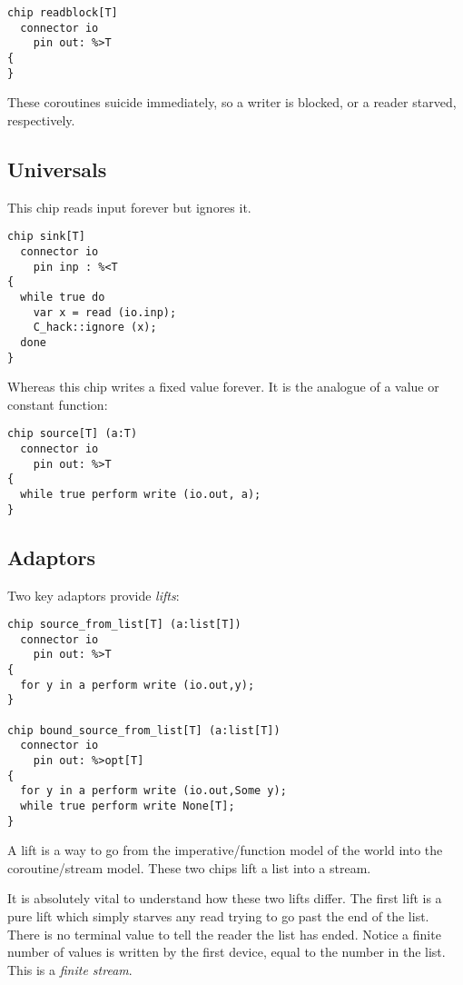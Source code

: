 \documentclass[oneside]{book}
\begin{document}
\begin{verbatim}
chip readblock[T]
  connector io
    pin out: %>T
{
}
\end{verbatim}

These coroutines suicide immediately, so a writer is blocked,
or a reader starved, respectively.

\subsection{Universals}
This chip reads input forever but ignores it.

\begin{verbatim}
chip sink[T]
  connector io
    pin inp : %<T
{
  while true do
    var x = read (io.inp);
    C_hack::ignore (x);
  done
}
\end{verbatim}

Whereas this chip writes a fixed value forever.
It is the analogue of a value or constant function:

\begin{verbatim}
chip source[T] (a:T)
  connector io
    pin out: %>T
{
  while true perform write (io.out, a);
}
\end{verbatim}

\subsection{Adaptors}
Two key adaptors provide {\em lifts}:


\begin{verbatim}
chip source_from_list[T] (a:list[T])
  connector io
    pin out: %>T
{
  for y in a perform write (io.out,y);
}

chip bound_source_from_list[T] (a:list[T])
  connector io
    pin out: %>opt[T]
{
  for y in a perform write (io.out,Some y);
  while true perform write None[T];
}
\end{verbatim}

A lift is a way to go from the imperative/function model
of the world into the coroutine/stream model. These
two chips lift a list into a stream.

It is absolutely vital to understand how these two
lifts differ. The first lift is a pure lift
which simply starves any read trying to go past the
end of the list. There is no terminal value to tell the
reader the list has ended. Notice a finite number
of values is written by the first device, equal to the
number in the list. This is a {\em finite stream}.
\end{document}
